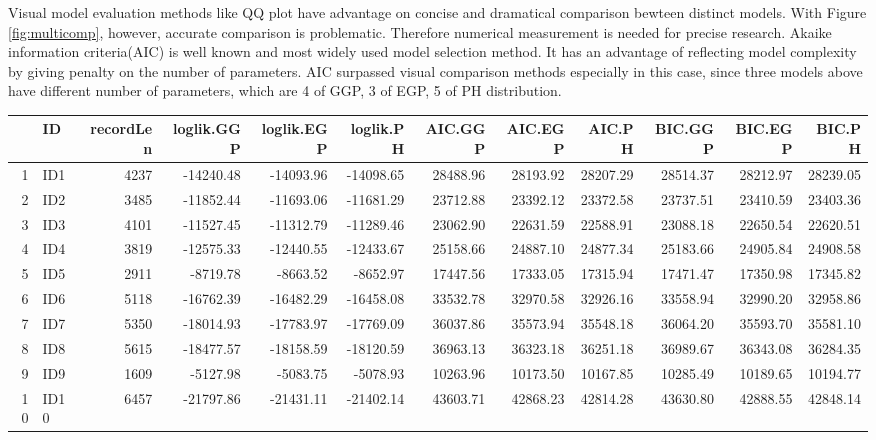 \documentclass[12pt]{article}\usepackage[]{graphicx}\usepackage[]{color}
\begin{document}
Visual model evaluation methods like QQ plot have advantage on concise and dramatical comparison bewteen distinct models. With Figure \ref{fig:multicomp}, however, accurate comparison is problematic. Therefore numerical measurement is needed for precise research. Akaike information criteria(AIC) \cite{akaike1974new} is well known and most widely used model selection method. It has an advantage of reflecting model complexity by giving penalty on the number of parameters. AIC surpassed visual comparison methods especially in this case, since three models above have different number of parameters, which are 4 of GGP, 3 of EGP, 5 of PH distribution.


\begin{table}[ht]
\centering
{\tiny
\begin{tabular}{rlrrrrrrrrrr}
  \toprule
 & ID & recordLen & loglik.GGP & loglik.EGP & loglik.PH & AIC.GGP & AIC.EGP & AIC.PH & BIC.GGP & BIC.EGP & BIC.PH \\ 
  \midrule
1 & ID1 & 4237 & -14240.48 & -14093.96 & -14098.65 & 28488.96 & 28193.92 & 28207.29 & 28514.37 & 28212.97 & 28239.05 \\ 
  2 & ID2 & 3485 & -11852.44 & -11693.06 & -11681.29 & 23712.88 & 23392.12 & 23372.58 & 23737.51 & 23410.59 & 23403.36 \\ 
  3 & ID3 & 4101 & -11527.45 & -11312.79 & -11289.46 & 23062.90 & 22631.59 & 22588.91 & 23088.18 & 22650.54 & 22620.51 \\ 
  4 & ID4 & 3819 & -12575.33 & -12440.55 & -12433.67 & 25158.66 & 24887.10 & 24877.34 & 25183.66 & 24905.84 & 24908.58 \\ 
  5 & ID5 & 2911 & -8719.78 & -8663.52 & -8652.97 & 17447.56 & 17333.05 & 17315.94 & 17471.47 & 17350.98 & 17345.82 \\ 
  6 & ID6 & 5118 & -16762.39 & -16482.29 & -16458.08 & 33532.78 & 32970.58 & 32926.16 & 33558.94 & 32990.20 & 32958.86 \\ 
  7 & ID7 & 5350 & -18014.93 & -17783.97 & -17769.09 & 36037.86 & 35573.94 & 35548.18 & 36064.20 & 35593.70 & 35581.10 \\ 
  8 & ID8 & 5615 & -18477.57 & -18158.59 & -18120.59 & 36963.13 & 36323.18 & 36251.18 & 36989.67 & 36343.08 & 36284.35 \\ 
  9 & ID9 & 1609 & -5127.98 & -5083.75 & -5078.93 & 10263.96 & 10173.50 & 10167.85 & 10285.49 & 10189.65 & 10194.77 \\ 
  10 & ID10 & 6457 & -21797.86 & -21431.11 & -21402.14 & 43603.71 & 42868.23 & 42814.28 & 43630.80 & 42888.55 & 42848.14 \\ 

\end{tabular}}
\end{table}
\end{document}
